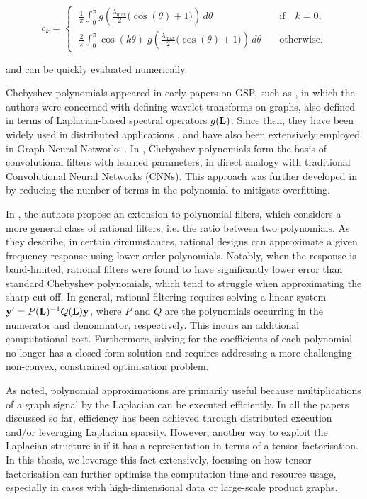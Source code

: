 \begin{equation}
    \label{eq:Cheb_int}
    c_k = \begin{cases}
        \displaystyle   
        \; \frac{1}{\pi} \int_{0}^{\pi} g\left(\frac{\lambda_{\text{max}}}{2} \big(\cos(\theta) + 1\big)\right) \, d\theta  & \quad \text{if} \quad k = 0, \\[0.8cm]
        \displaystyle   
        \; \frac{2}{\pi} \int_{0}^{\pi} \cos(k \theta) \; g\left(\frac{\lambda_{\text{max}}}{2} \big(\cos(\theta) + 1\big)\right) \, d\theta  & \quad \text{otherwise.}
    \end{cases}
\end{equation}

and can be quickly evaluated numerically. 


Chebyshev polynomials appeared in early papers on GSP, such as \citep{Hammond2011}, in which the authors were concerned with defining wavelet transforms on graphs, also defined in terms of Laplacian-based spectral operators $g(\mathbf{L})$. Since then, they have been widely used in distributed applications \citep{Shuman2018}, and have also been extensively employed in Graph Neural Networks \citep{Gama2020}. In \cite{Defferrard2017}, Chebyshev polynomials form the basis of convolutional filters with learned parameters, in direct analogy with traditional Convolutional Neural Networks (CNNs). This approach was further developed in \cite{Kipf2017} by reducing the number of terms in the polynomial to mitigate overfitting.

In \cite{Rimleanscaia2020, Tseng2020}, the authors propose an extension to polynomial filters, which considers a more general class of rational filters, i.e. the ratio between two polynomials. As they describe, in certain circumstances, rational designs can approximate a given frequency response using lower-order polynomials. Notably, when the response is band-limited, rational filters were found to have significantly lower error than standard Chebyshev polynomials, which tend to struggle when approximating the sharp cut-off. In general, rational filtering requires solving a linear system $\mathbf{y}' = P(\mathbf{L})^{-1} Q(\mathbf{L}) \mathbf{y}$, where $P$ and $Q$ are the polynomials occurring in the numerator and denominator, respectively. This incurs an additional computational cost. Furthermore, solving for the coefficients of each polynomial no longer has a closed-form solution and requires addressing a more challenging non-convex, constrained optimisation problem.

As noted, polynomial approximations are primarily useful because multiplications of a graph signal by the Laplacian can be executed efficiently. In all the papers discussed so far, efficiency has been achieved through distributed execution and/or leveraging Laplacian sparsity. However, another way to exploit the Laplacian structure is if it has a representation in terms of a tensor factorisation. In this thesis, we leverage this fact extensively, focusing on how tensor factorisation can further optimise the computation time and resource usage, especially in cases with high-dimensional data or large-scale product graphs.



